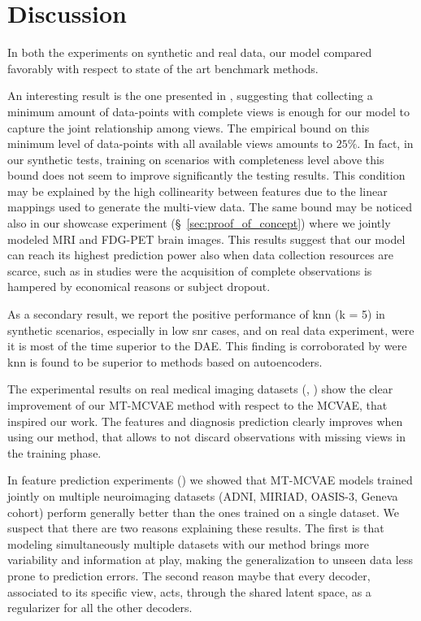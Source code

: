\section{Discussion}

In both the experiments on synthetic and real data, our model compared favorably with respect to state of the art benchmark methods.

An interesting result is the one presented in , suggesting that collecting a minimum amount of data-points with complete views is enough for our model to capture the joint relationship among views.
The empirical bound on this minimum level of data-points with all available views amounts to $25\%$.
In fact, in our synthetic tests, training on scenarios with completeness level above this bound does not seem to improve significantly the testing results.
This condition may be explained by the high collinearity between features due to the linear mappings used to generate the multi-view data.
The same bound may be noticed also in our showcase experiment (\S~\ref{sec:proof_of_concept}) where we jointly modeled MRI and FDG-PET brain images.
This results suggest that our model can reach its highest prediction power also when data collection resources are scarce,
such as in studies were the acquisition of complete observations is hampered by economical reasons or subject dropout.

As a secondary result, we report the positive performance of knn (k = 5) in synthetic scenarios, especially in low snr cases, and on real data experiment, were it is most of the time superior to the DAE.
This finding is corroborated by \cite{Platias2020} were knn is found to be superior to methods based on autoencoders.

The experimental results on real medical imaging datasets (, ) show the clear improvement of our MT-MCVAE method with respect to the MCVAE, that inspired our work.
The features and diagnosis prediction clearly improves when using our method, that allows to not discard observations with missing views in the training phase.

In feature prediction experiments () we showed that MT-MCVAE models trained jointly on multiple neuroimaging datasets (ADNI, MIRIAD, OASIS-3, Geneva cohort)
perform generally better than the ones trained on a single dataset.
We suspect that there are two reasons explaining these results.
The first is that modeling simultaneously multiple datasets with our method brings more variability and information at play, making the generalization to unseen data less prone to prediction errors.
The second reason maybe that every decoder, associated to its specific view, acts, through the shared latent space, as a regularizer for all the other decoders.

